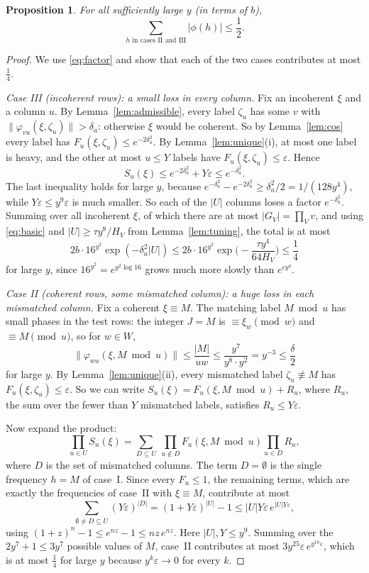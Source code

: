 \documentclass[11pt]{amsart}
\newtheorem{proposition}[theorem]{Proposition}
\theoremstyle{definition}
\theoremstyle{remark}
\newcommand{\nint}[1]{\lVert #1\rVert}
\begin{document}
\begin{proposition}\label{prop:minor}
For all sufficiently large $y$ (in terms of $b$),
\[
 \sum_{h\text{ in cases II and III}}|\phi(h)|\le\frac12 .
\]
\end{proposition}
\begin{proof}
We use \eqref{eq:factor} and show that each of the two cases contributes at most $\frac14$.

\emph{Case III (incoherent rows): a small loss in every column.} Fix an incoherent $\xi$ and a column $u$. By Lemma~\ref{lem:admissible}, every label $\zeta_u$ has some $v$ with $\nint{\varphi_{vu}(\xi,\zeta_u)}>\delta_a$: otherwise $\xi$ would be coherent. So by Lemma~\ref{lem:cos} every label has $F_u(\xi,\zeta_u)\le e^{-2\delta_a^2}$. By Lemma~\ref{lem:unique}(i), at most one label is heavy, and the other at most $u\le Y$ labels have $F_u(\xi,\zeta_u)\le\varepsilon$. Hence
\[
 S_u(\xi)\le e^{-2\delta_a^2}+Y\varepsilon\le e^{-\delta_a^2}.
\]
The last inequality holds for large $y$, because $e^{-\delta_a^2}-e^{-2\delta_a^2}\ge\delta_a^2/2=1/(128y^4)$, while $Y\varepsilon\le y^9\varepsilon$ is much smaller. So each of the $|U|$ columns loses a factor $e^{-\delta_a^2}$. Summing over all incoherent $\xi$, of which there are at most $|G_V|=\prod_Vv$, and using \eqref{eq:basic} and $|U|\ge\tau y^8/H_V$ from Lemma~\ref{lem:tuning}, the total is at most
\[
 2b\cdot16^{y^2}\exp(-\delta_a^2|U|)\le2b\cdot16^{y^2}\exp\Big(-\frac{\tau y^4}{64H_V}\Big)\le\frac14
\]
for large $y$, since $16^{y^2}=e^{y^2\log16}$ grows much more slowly than $e^{cy^4}$.

\emph{Case II (coherent rows, some mismatched column): a huge loss in each mismatched column.} Fix a coherent $\xi\equiv M$. The matching label $M\bmod u$ has small phases in the test rows: the integer $J=M$ is $\equiv\xi_w\pmod w$ and $\equiv M\pmod u$, so for $w\in W$,
\[
 \nint{\varphi_{wu}(\xi,M\bmod u)}\le\frac{|M|}{uw}\le\frac{y^7}{y^8\cdot y^2}=y^{-3}\le\frac\delta2
\]
for large $y$. By Lemma~\ref{lem:unique}(ii), every mismatched label $\zeta_u\not\equiv M$ has $F_u(\xi,\zeta_u)\le\varepsilon$. So we can write $S_u(\xi)=F_u(\xi,M\bmod u)+R_u$, where $R_u$, the sum over the fewer than $Y$ mismatched labels, satisfies $R_u\le Y\varepsilon$.

Now expand the product:
\[
 \prod_{u\in U}S_u(\xi)=\sum_{D\subseteq U}\ \prod_{u\notin D}F_u(\xi,M\bmod u)\prod_{u\in D}R_u ,
\]
where $D$ is the set of mismatched columns. The term $D=\emptyset$ is the single frequency $h=M$ of case~I. Since every $F_u\le1$, the remaining terms, which are exactly the frequencies of case~II with $\xi\equiv M$, contribute at most
\[
 \sum_{\emptyset\ne D\subseteq U}(Y\varepsilon)^{|D|}=(1+Y\varepsilon)^{|U|}-1\le|U|Y\varepsilon\,e^{|U|Y\varepsilon},
\]
using $(1+z)^n-1\le e^{nz}-1\le nz\,e^{nz}$. Here $|U|,Y\le y^9$. Summing over the $2y^7+1\le3y^7$ possible values of $M$, case~II contributes at most $3y^{25}\varepsilon\,e^{y^{18}\varepsilon}$, which is at most $\frac14$ for large $y$ because $y^k\varepsilon\to0$ for every $k$.
\end{proof}
\end{document}
